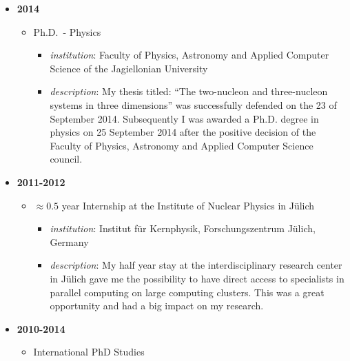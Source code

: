 \begin{itemize}
\tightlist
\item
  \textbf{2014}

  \begin{itemize}
  \tightlist
  \item
    Ph.D.~- Physics

    \begin{itemize}
    \tightlist
    \item
      \emph{institution}: Faculty of Physics, Astronomy and Applied
      Computer Science of the Jagiellonian University
    \item
      \emph{description}: My thesis titled: ``The two-nucleon and
      three-nucleon systems in three dimensions'' was successfully
      defended on the 23 of September 2014. Subsequently I was awarded a
      Ph.D. degree in physics on 25 September 2014 after the positive
      decision of the Faculty of Physics, Astronomy and Applied Computer
      Science council.
    \end{itemize}
  \end{itemize}
\item
  \textbf{2011-2012}

  \begin{itemize}
  \tightlist
  \item
    \(\approx 0.5\) year Internship at the Institute of Nuclear Physics
    in Jülich

    \begin{itemize}
    \tightlist
    \item
      \emph{institution}: Institut für Kernphysik, Forschungszentrum
      Jülich, Germany
    \item
      \emph{description}: My half year stay at the interdisciplinary
      research center in Jülich gave me the possibility to have direct
      access to specialists in parallel computing on large computing
      clusters. This was a great opportunity and had a big impact on my
      research.
    \end{itemize}
  \end{itemize}
\item
  \textbf{2010-2014}

  \begin{itemize}
  \tightlist
  \item
    International PhD Studies


\end{itemize}
\end{itemize}
